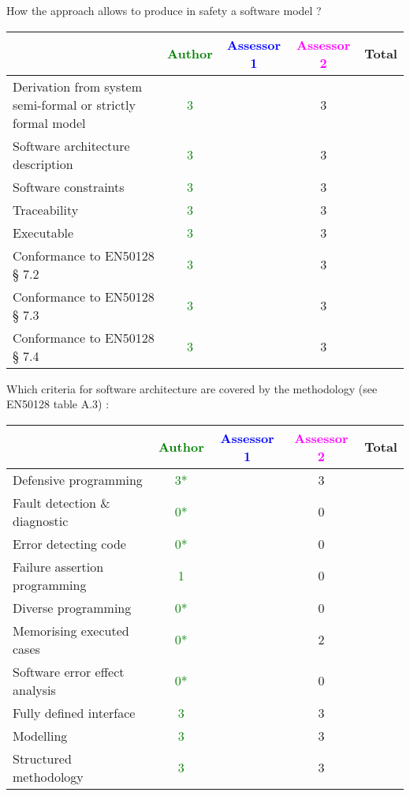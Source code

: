 How the approach allows to  produce in safety a software model ?

\begin{tabular}{|l | c | c | c | c|}
\hline
& \textcolor{green}{Author} & \textcolor{blue}{Assessor 1} & \textcolor{magenta}{Assessor 2} & Total \\
\hline
Derivation from system semi-formal or strictly formal model  & \textcolor{green}{3} & &3 &  \\
\hline 
Software architecture description  & \textcolor{green}{3} & &3 &  \\
\hline
Software constraints  & \textcolor{green}{3} & &3 &  \\
\hline
Traceability  & \textcolor{green}{3} & &3 &  \\
\hline
Executable  & \textcolor{green}{3} & &3 &  \\
\hline
Conformance to EN50128 § 7.2  & \textcolor{green}{3} & &3 &  \\
\hline
Conformance to EN50128 § 7.3  & \textcolor{green}{3} & &3 &  \\
\hline
Conformance to EN50128 § 7.4  & \textcolor{green}{3}& &3 &  \\
\hline
\end{tabular}

Which criteria for software architecture are covered by the methodology
(see EN50128 table A.3) :

\begin{tabular}{|l | c | c | c | c|}
\hline
& \textcolor{green}{Author} & \textcolor{blue}{Assessor 1} & \textcolor{magenta}{Assessor 2} & Total \\
\hline
Defensive programming  & \textcolor{green}{3*} & &3 &  \\
\hline 
Fault detection \& diagnostic  & \textcolor{green}{0*} & &0 &  \\
\hline
Error detecting code  & \textcolor{green}{0*} & &0 &  \\
\hline
Failure assertion programming & \textcolor{green}{1} & &0 &  \\
\hline
Diverse programming & \textcolor{green}{0*} & &0 &  \\
\hline
Memorising executed cases & \textcolor{green}{0*} & &2 &  \\
\hline
Software error effect analysis & \textcolor{green}{0*} & &0 &  \\
\hline
Fully defined interface & \textcolor{green}{3} & &3 &  \\
\hline
Modelling  & \textcolor{green}{3} & &3 &  \\
\hline
Structured methodology & \textcolor{green}{3} & &3 &  \\
\hline
\end{tabular}

